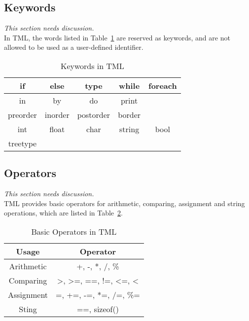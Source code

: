 \documentclass[12pt,psfig,a4]{article}
\begin{document}
\subsection{Keywords}
\textit{This section needs discussion.}\\
In TML, the words listed in Table~\ref{keywords} are reserved as keywords, and are not allowed to be used as a user-defined identifier.

\begin{table}[ht]
\begin{center}
\begin{tabular}{| c | c | c | c | c |}
\hline
if & else & type & while & foreach \\
\hline
in & by & do & print &\\
\hline
preorder & inorder & postorder & border &\\
\hline
int & float & char & string & bool  \\
\hline
treetype &  & & & \\
\hline
\end{tabular}
\caption{Keywords in TML}
\label{keywords}
\end {center}
\end{table}

\subsection{Operators}
\textit{This section needs discussion.}\\
TML provides basic operators for arithmetic, comparing, assignment and string operations, which are listed in Table~\ref{basic_operators}.

\begin{table}[ht]
\begin{center}
\begin{tabular}{| c | c |}
\hline
\textbf{Usage} & \textbf{Operator} \\
\hline
Arithmetic & +, -, *, /, \% \\
\hline
Comparing & \textgreater, \textgreater=, ==, !=, \textless=, \textless \\
\hline
Assignment & =, +=, -=, *=, /=, \%= \\
\hline
Sting & ==, sizeof() \\
\hline
\end{tabular}
\caption{Basic Operators in TML}
\label{basic_operators}
\end {center}
\end{table}





\end{document}
